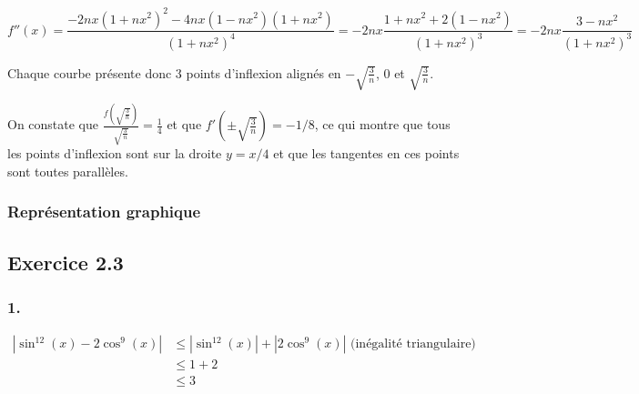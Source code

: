 \documentclass[a4paper,10pt]{report}
\begin{document}
\begin{displaymath}
	f''(x) = \frac{-2nx(1+nx^2)^2-4nx(1-nx^2)(1+nx^2)}{(1+nx^2)^4}
	       =-2nx\frac{1+nx^2+2(1-nx^2)}{(1+nx^2)^3}
	       = -2nx\frac{3-nx^2}{(1+nx^2)^3}
\end{displaymath}

Chaque courbe présente donc 3 points d'inflexion alignés en $-\sqrt{\frac{3}{n}}$, $0$ et $\sqrt{\frac{3}{n}}$.

On constate que $\frac{f(\sqrt{\frac{3}{n}})}{\sqrt{\frac{3}{n}}} = \frac{1}{4}$ et que $f'\left({\pm \sqrt{\frac{3}{n}}}\right)=-1/8$, ce qui montre que tous les points d'inflexion sont sur la droite
$y=x/4$ et que les tangentes en ces points sont toutes parallèles.

\subsubsection*{Représentation graphique}


\subsection*{Exercice 2.3}

\subsubsection*{1.}

\begin{equation*}
	\begin{split}
		|\sin^{12}(x) - 2\cos^9(x)| &\leq |\sin^{12}(x)|+ |2\cos^9(x)| \text{ (inégalité triangulaire)} \\
		                         &\leq 1 + 2 \\
		                         & \leq 3
	\end{split}
\end{equation*}
\end{document}
